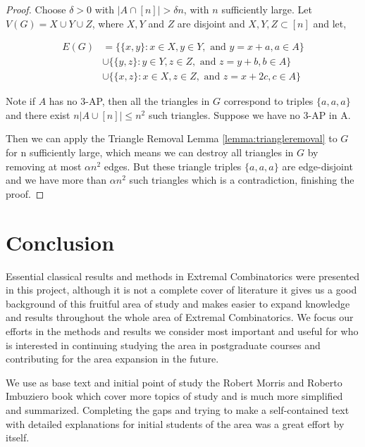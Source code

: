 \documentclass[12pt,twoside,a4paper,bibliography=totocnumbered]{book}
\numberwithin{equation}{section}
\theoremstyle{remark}
\begin{document}
\begin{proof}
Choose $\delta > 0$ with $|A \cap [n]| > \delta n$, with $n$ sufficiently large. Let $V(G) = X\cup Y \cup Z$, where $X, Y$ and $Z$ are disjoint and $X,Y,Z \subset [n]$ and let,

\begin{align*}
E(G) &= \{\{x,y\}\colon x \in X, y \in Y,\text{ and } y = x + a, a \in A\} \\
& \cup \{\{y,z\} \colon y \in Y, z \in Z, \text{ and } z = y + b, b \in A\}\\
& \cup \{\{x,z\} \colon x \in X, z \in Z, \text{ and } z = x +2c, c\in A\}
\end{align*}

Note if $A$ has no $3$-AP, then all the triangles in $G$ correspond to triples $\{a,a,a\}$ and there exist $n|A\cup [n]| \leq n^2$ such triangles. Suppose we have no $3$-AP in A.
 
 Then we can apply the Triangle Removal Lemma \ref{lemma:triangleremoval} to $G$ for n sufficiently large, which means we can destroy all triangles in $G$ by removing at most $\alpha n^2$ edges. But these triangle triples $\{a,a,a\}$ are edge-disjoint and we have more than $\alpha n^2 $ such triangles which is a contradiction, finishing the proof.
 
\end{proof}

\chapter{Conclusion}
Essential classical results and methods in Extremal Combinatorics were presented in this project, although it is not a complete cover of literature it gives us a good background of this fruitful area of study and makes easier to expand knowledge and results throughout the whole area of Extremal Combinatorics. We focus our efforts in the methods and results we consider most important and useful for who is interested in continuing studying the area in postgraduate courses and contributing for the area expansion in the future.

We use as base text and initial point of study the Robert Morris and Roberto Imbuziero book \cite{RoRo11} which cover more topics of study and is much more simplified and	 summarized. Completing the gaps and trying to make a self-contained text with detailed explanations for initial students of the area was a great effort by itself.






\end{document}
